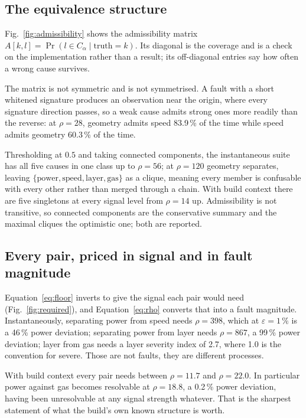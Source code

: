 \documentclass[preprint,12pt]{elsarticle}
\begin{document}
\subsection{The equivalence structure}
\label{sec:classes}

Fig.~\ref{fig:admissibility} shows the admissibility matrix
$A[k,l] = \Pr(l \in C_\alpha \mid \text{truth} = k)$. Its diagonal is the
coverage and is a check on the implementation rather than a result; its
off-diagonal entries say how often a wrong cause survives.

The matrix is not symmetric and is not symmetrised. A fault with a short
whitened signature produces an observation near the origin, where every
signature direction passes, so a weak cause admits strong ones more readily than
the reverse: at $\rho = 28$, geometry admits speed 83.9\,\% of the time while
speed admits geometry 60.3\,\% of the time.

Thresholding at $0.5$ and taking connected components, the instantaneous suite
has all five causes in one class up to $\rho = 56$; at $\rho = 120$ geometry
separates, leaving $\{\text{power}, \text{speed}, \text{layer}, \text{gas}\}$ as
a clique, meaning every member is confusable with every other rather than merged
through a chain. With build context there are five singletons at every signal
level from $\rho = 14$ up. Admissibility is not transitive, so connected
components are the conservative summary and the maximal cliques the optimistic
one; both are reported.

\subsection{Every pair, priced in signal and in fault magnitude}
\label{sec:priced}

Equation~\eqref{eq:floor} inverts to give the signal each pair would need
(Fig.~\ref{fig:required}), and Equation~\eqref{eq:rho} converts that into a
fault magnitude. Instantaneously, separating power from speed needs
$\rho = 398$, which at $\varepsilon = 1\,\%$ is a 46\,\% power deviation;
separating power from layer needs $\rho = 867$, a 99\,\% power deviation; layer
from gas needs a layer severity index of 2.7, where 1.0 is the convention for
severe. Those are not faults, they are different processes.

With build context every pair needs between $\rho = 11.7$ and $\rho = 22.0$. In
particular power against gas becomes resolvable at $\rho = 18.8$, a 0.2\,\%
power deviation, having been unresolvable at any signal strength whatever. That
is the sharpest statement of what the build's own known structure is worth.
\end{document}
